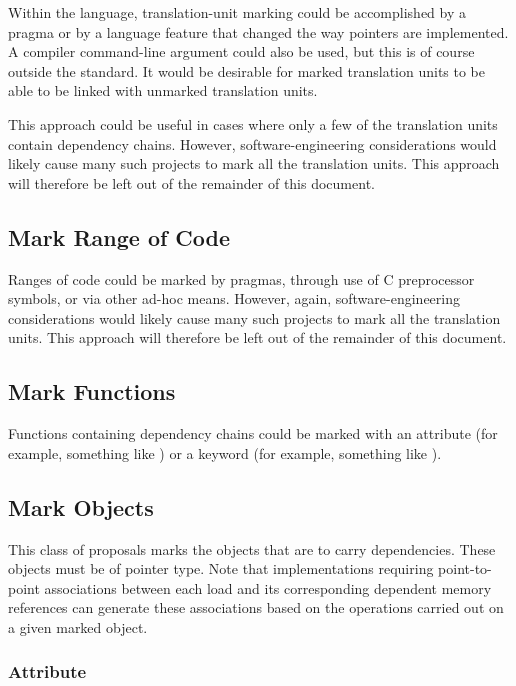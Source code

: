 \documentclass[letterpaper,twocolumn,10pt]{article}
\begin{document}
Within the language, translation-unit marking could be accomplished by
a pragma or by a language feature that changed the way pointers are
implemented.
A compiler command-line argument could also be used, but this is of
course outside the standard.
It would be desirable for marked translation units to be able to
be linked with unmarked translation units.

This approach could be useful in cases where only a few of the translation
units contain dependency chains.
However, software-engineering considerations would likely cause many such
projects to mark all the translation units.
This approach will therefore be left out of the remainder of this document.

\subsection{Mark Range of Code}
\label{sec:Mark Range of Code}

Ranges of code could be marked by pragmas, through use of C preprocessor
symbols, or via other ad-hoc means.
However, again, software-engineering considerations would likely cause
many such projects to mark all the translation units.
This approach will therefore be left out of the remainder of this document.

\subsection{Mark Functions}
\label{sec:Mark Functions}

Functions containing dependency chains could be marked with
an attribute (for example, something like
) or
a keyword (for example, something like
).

\subsection{Mark Objects}
\label{sec:Mark Objects}

This class of proposals marks the objects that are to carry dependencies.
These objects must be of pointer type.
Note that implementations requiring point-to-point associations between
each  load and its corresponding dependent
memory references can generate these associations based on the
operations carried out on a given marked object.

\subsubsection{Attribute}
\label{sec:Attribute}
\end{document}
